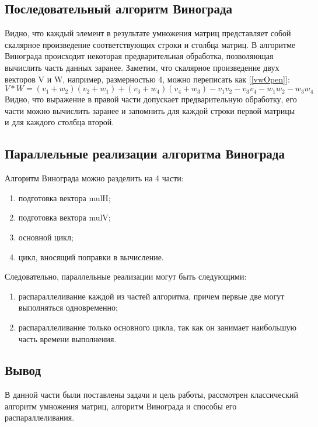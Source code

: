 \documentclass{article}
\begin{document}
		\subsection{Последовательный алгоритм Винограда}
		Видно, что каждый элемент в результате умножения матриц представляет собой скалярное произведение соответствующих строки и столбца матриц. В алгоритме Винограда происходит некоторая предварительная обработка, позволяющая вычислить часть данных заранее. Заметим, что скалярное произведение двух векторов V и W, например, размерностью 4, можно переписать как \hyperref[vwOpen]{[\ref{vwOpen}]}:
		\begin{equation}\label{vwOpen}
		V * W = (v_{1} + w_{2})(v_{2} + w_{1}) + (v_{3} + w_{4})(v_{4} + w_{3}) -  v_{1}v_{2} - v_{3}v_{4} - w_{1}w_{2} - w_{3}w_{4}
	\end{equation}
	\indent Видно, что выражение в правой части допускает предварительную обработку, его части можно вычислить заранее и запомнить для каждой строки первой матрицы и для каждого столбца второй.\cite{vinogradRef}

	\subsection{Параллельные реализации алгоритма Винограда}
Алгоритм Винограда можно разделить на 4 части:
\begin{enumerate}
\item подготовка вектора mulH;
\item подготовка вектора mulV;
\item основной цикл;
\item цикл, вносящий поправки в вычисление.
\end{enumerate}
Следовательно, параллельные реализации могут быть следующими:
\begin{enumerate}
\item распараллеливание каждой из частей алгоритма, причем первые две могут выполняться одновременно;
\item распараллеливание только основного цикла, так как он занимает наибольшую часть времени выполнения.
\end{enumerate}
	\subsection{Вывод}
	В данной части были поставлены задачи и цель работы, рассмотрен классический  алгоритм умножения матриц, алгоритм Винограда и способы его распараллеливания.
		
\end{document}
